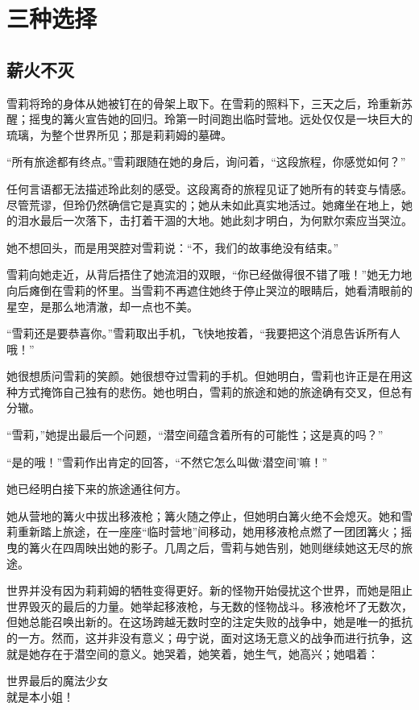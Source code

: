 \chapter{三种选择}

\section{ 薪火不灭}

雪莉将玲的身体从她被钉在的骨架上取下。在雪莉的照料下，三天之后，玲重新苏醒；摇曳的篝火宣告她的回归。玲第一时间跑出临时营地。远处仅仅是一块巨大的琉璃，为整个世界所见；那是莉莉姆的墓碑。

“所有旅途都有终点。”雪莉跟随在她的身后，询问着，“这段旅程，你感觉如何？”

任何言语都无法描述玲此刻的感受。这段离奇的旅程见证了她所有的转变与情感。尽管荒谬，但玲仍然确信它是真实的；她从未如此真实地活过。她瘫坐在地上，她的泪水最后一次落下，击打着干涸的大地。她此刻才明白，为何默尔索应当哭泣。

她不想回头，而是用哭腔对雪莉说：“不，我们的故事绝没有结束。”

雪莉向她走近，从背后捂住了她流泪的双眼，“你已经做得很不错了哦！”她无力地向后瘫倒在雪莉的怀里。当雪莉不再遮住她终于停止哭泣的眼睛后，她看清眼前的星空，是那么地清澈，却一点也不美。

“雪莉还是要恭喜你。”雪莉取出手机，飞快地按着，“我要把这个消息告诉所有人哦！”

她很想质问雪莉的笑颜。她很想夺过雪莉的手机。但她明白，雪莉也许正是在用这种方式掩饰自己独有的悲伤。她也明白，雪莉的旅途和她的旅途确有交叉，但总有分辙。

“雪莉，”她提出最后一个问题，“潜空间蕴含着所有的可能性；这是真的吗？”

“是的哦！”雪莉作出肯定的回答，“不然它怎么叫做‘潜空间’嘛！”

她已经明白接下来的旅途通往何方。

她从营地的篝火中拔出移液枪；篝火随之停止，但她明白篝火绝不会熄灭。她和雪莉重新踏上旅途，在一座座“临时营地”间移动，她用移液枪点燃了一团团篝火；摇曳的篝火在四周映出她的影子。几周之后，雪莉与她告别，她则继续她这无尽的旅途。

世界并没有因为莉莉姆的牺牲变得更好。新的怪物开始侵扰这个世界，而她是阻止世界毁灭的最后的力量。她举起移液枪，与无数的怪物战斗。移液枪坏了无数次，但她总能召唤出新的。在这场跨越无数时空的注定失败的战争中，她是唯一的抵抗的一方。然而，这并非没有意义；毋宁说，面对这场无意义的战争而进行抗争，这就是她存在于潜空间的意义。她哭着，她笑着，她生气，她高兴；她唱着：
\begin{song}
世界最后的魔法少女\\
就是本小姐！
\end{song}

